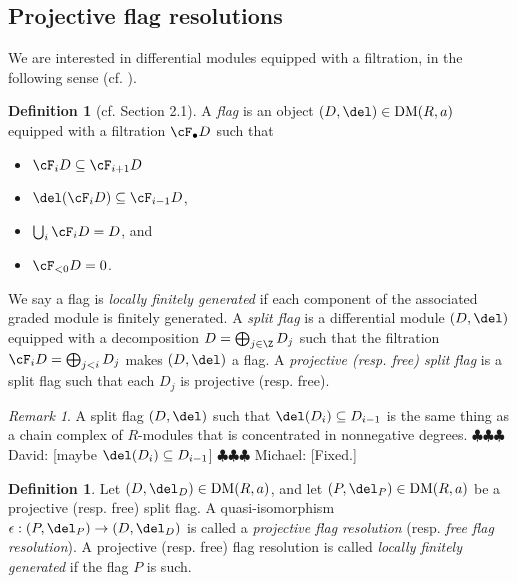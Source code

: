 \documentclass[12pt]{amsart}
\theoremstyle{definition}
\newtheorem{defn}[lemma]{Definition}
\newtheorem{example}[lemma]{Example}
\theoremstyle{remark}
\newtheorem{rem}[lemma]{Remark}
\newcommand{\ZZ}{\mathbb Z}
\newcommand{\michael}[1]{{\color{red} \sf $\clubsuit\clubsuit\clubsuit$ Michael: [#1]}}
\newcommand{\david}[1]{{\color{green} \sf $\clubsuit\clubsuit\clubsuit$ David: [#1]}}
\def\DM{\operatorname{DM}}
\begin{document}
\subsection{Projective flag resolutions}

We are interested in differential modules equipped with a filtration, in the following sense (cf. \cite[2.1]{ABI}). 

\begin{defn}[cf. \cite{ABI} Section 2.1]
A \emph{flag} is an object $(D, \del) \in \DM(R, a)$ equipped with a filtration $\cF_\bullet D$ such that 
\begin{itemize}
\item $\cF_i D \subseteq \cF_{i + 1} D$
\item $\del(\cF_i D) \subseteq \cF_{i - 1} D$, 
\item $\bigcup_i \cF_i D = D$, and
\item $\cF_{< 0} D = 0$.
\end{itemize}
We say a flag is \emph{locally finitely generated} if each component of the associated graded module is finitely generated. A \emph{split flag} is a differential module $(D, \del)$ equipped with a decomposition $D = \bigoplus_{j \in \Z} D_j$ such that the filtration $\cF_i D = \bigoplus_{j < i} D_j$ makes $(D, \del)$ a flag. A \emph{projective (resp. free) split flag} is a split flag such that each $D_j$ is projective (resp. free). 
\end{defn}

\iffalse
\begin{example}
Take $R = \ZZ[x]/(x^2)$. 
The complex
$$
0 \to R \xra{x} R(1) \xra{x} \cdots
$$
thought of as a differential module, does not admit a flag. The object $(\ZZ[x]/(x^2), x) \in \DM(R, a)$ admits a flag, but not a split flag.
\end{example}
\fi

\begin{rem}
A split flag $(D, \del)$ such that $\del(D_i) \subseteq D_{i - 1}$ is the same thing as a 
chain complex of $R$-modules that is concentrated in nonnegative degrees.  
\david{maybe $\del(D_i) \subseteq D_{i - 1}$}\michael{Fixed.}
\end{rem}

\begin{defn}
Let $(D, \del_D) \in \DM(R, a)$, and let $(P, \del_P) \in \DM(R, a)$ be a projective (resp. free) split flag. A quasi-isomorphism $\epsilon: (P, \del_P) \to (D, \del_D)$ is called a \emph{projective flag resolution} (resp. \emph{free flag resolution}). A projective (resp. free) flag resolution is called \emph{locally finitely generated} if the flag $P$ is such. 
\end{defn}
\end{document}
